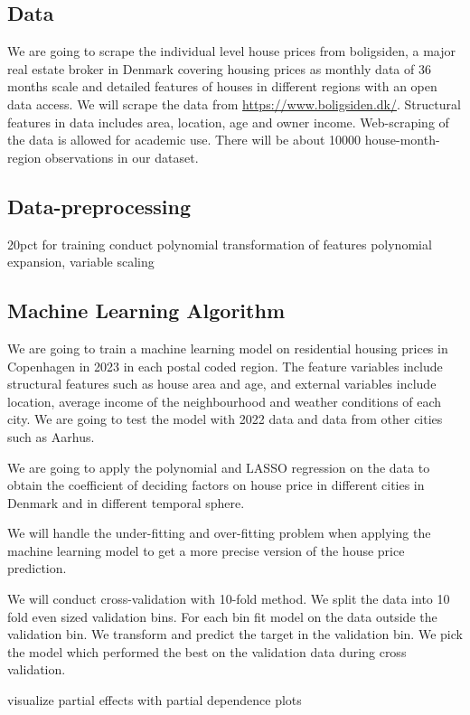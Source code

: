 \documentclass[12pt]{article} %
\begin{document}
	\subsection{Data}
			We are going to scrape the individual level house prices from boligsiden, a major real estate broker in Denmark covering housing prices as monthly data of 36 months scale and detailed features of houses in different regions with an open data access. We will scrape the data from \url{https://www.boligsiden.dk/}. Structural features in data includes area, location, age and owner income. Web-scraping of the data is allowed for academic use. There will be about 10000 house-month-region observations in our dataset. 
	\subsection{Data-preprocessing}
		20pct for training
		conduct polynomial transformation of features
		polynomial expansion, variable scaling

		

	\subsection{Machine Learning Algorithm}
		We are going to train a machine learning model on residential housing prices in Copenhagen in 2023 in each postal coded region. The feature variables include structural features such as house area and age, and external variables include location, average income of the neighbourhood and weather conditions of each city. We are going to test the model with 2022 data and data from other cities such as Aarhus.\par
		We are going to apply the polynomial and LASSO regression on the data to obtain the coefficient of deciding factors on house price in different cities in Denmark and in different temporal sphere.\par
		We will handle the under-fitting and over-fitting problem when applying the machine learning model to get a more precise version of the house price prediction.\par
		We will conduct cross-validation with 10-fold method. We split the data into 10 fold even sized validation bins. For each bin fit model on the data outside the validation bin. We transform and predict the target in the validation bin. We pick the model which performed the best on the validation data during cross validation.\par
		visualize partial effects with partial dependence plots
		
\end{document}
